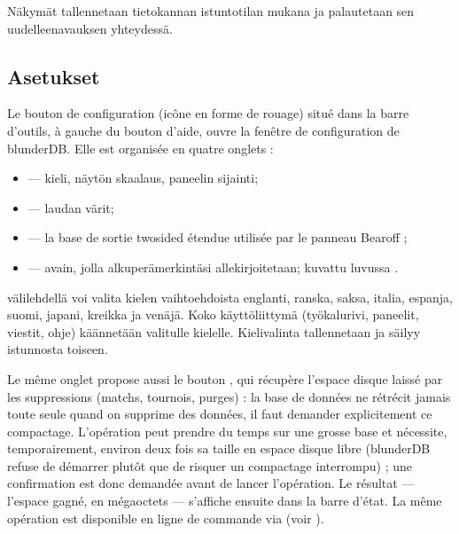 \documentclass[letterpaper,10pt,finnish]{sphinxmanual}
\begin{document}
\sphinxAtStartPar
Näkymät tallennetaan tietokannan istuntotilan mukana ja palautetaan sen uudelleenavauksen yhteydessä.


\subsection{Asetukset}
\label{\detokenize{manuel:configuration}}\label{\detokenize{manuel:id2}}
\sphinxAtStartPar
Le bouton de configuration (icône en forme de rouage) situé dans la barre
d’outils, à gauche du bouton d’aide, ouvre la fenêtre de configuration de
blunderDB. Elle est organisée en quatre onglets :
\begin{itemize}
\item {} 
\sphinxAtStartPar
{} — kieli, näytön skaalaus, paneelin sijainti;

\item {} 
\sphinxAtStartPar
{} — laudan värit;

\item {} 
\sphinxAtStartPar
{} — la base de sortie two\sphinxhyphen{}sided étendue utilisée par le panneau
Bearoff ;

\item {} 
\sphinxAtStartPar
{} — avain, jolla alkuperämerkintäsi allekirjoitetaan; kuvattu luvussa {\hyperref[\detokenize{manuel:diffusion-controlee}]{}}.

\end{itemize}

\sphinxAtStartPar
{}\sphinxhyphen{}välilehdellä voi valita kielen vaihtoehdoista englanti, ranska, saksa, italia, espanja, suomi, japani, kreikka ja venäjä. Koko käyttöliittymä (työkalurivi, paneelit, viestit, ohje) käännetään valitulle kielelle. Kielivalinta tallennetaan ja säilyy istunnosta toiseen.

\sphinxAtStartPar
Le même onglet propose aussi le bouton , qui récupère
l’espace disque laissé par les suppressions (matchs, tournois, purges) : la
base de données ne rétrécit jamais toute seule quand on supprime des données,
il faut demander explicitement ce compactage. L’opération peut prendre du
temps sur une grosse base et nécessite, temporairement, environ deux fois sa
taille en espace disque libre (blunderDB refuse de démarrer plutôt que de
risquer un compactage interrompu) ; une confirmation est donc demandée avant
de lancer l’opération. Le résultat — l’espace gagné, en mégaoctets — s’affiche
ensuite dans la barre d’état. La même opération est disponible en ligne de
commande via  (voir {\hyperref[\detokenize{cli:cli}]{}}).
\end{document}
